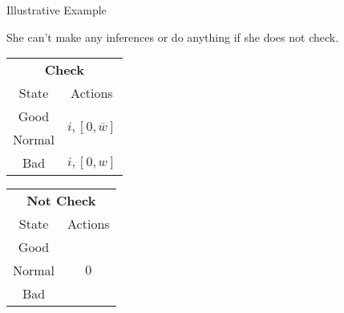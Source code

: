\documentclass[usenames,dvipsnames,aspectratio=169,11pt, envcountsect]{beamer}
\begin{document}
\begin{frame}[noframenumbering]{Illustrative Example}

	She can't make any inferences or do anything if she does not check.

	\vfill

	\begin{table}[H]
		\centering
		\begin{minipage}{0.29\textwidth}

		\end{minipage}\hspace{0.3cm} %
		\begin{minipage}{0.29\textwidth}
			\centering
			\begin{tabular}{c | c}
				\multicolumn{2}{c}{\textbf{Check}}                                                                            \\
				State                        & Actions                                                                        \\
				\hline
				{\color{bleudefrance}Good}   & \multirow{2}{*}{{\color{bleudefrance}\( i, \left[ 0, \overline{w} \right] \)}} \\
				{\color{bleudefrance}Normal} &                                                                                \\
				Bad                          & \(  i, \left[0, w \right] \)                                                   \\
			\end{tabular}
			\vspace{0.5cm} %
		\end{minipage}\hspace{0.7cm} %
		\begin{minipage}{0.29\textwidth}
			\centering
			\begin{tabular}{c | c}
				\multicolumn{2}{c}{\textbf{Not Check}} \\
				State  & Actions                       \\
				\hline
				Good   & \multirow{3}{*}{ \( 0 \)}     \\
				Normal &                               \\
				Bad    &                               \\
			\end{tabular}
			\vspace{0.5cm} %
		\end{minipage}
	\end{table}

\end{frame}
\end{document}
